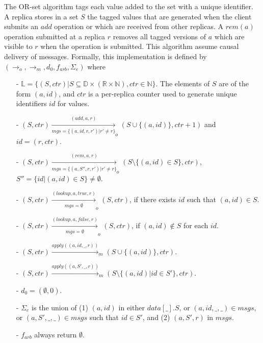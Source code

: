  The OR-set algorithm tags each value added to the set with a unique identifier. A replica stores in a set $S$ the tagged values that are generated when the client submits an $add$ operation or which are received from other replicas. A $\mathit{rem}(a)$ operation submitted at a replica $r$ removes all tagged versions of $a$ which are visible to $r$ when the operation is submitted. This algorithm assume causal delivery of messages. Formally, this implementation is defined by $(\rightarrow_o,\rightarrow_m,d_0,f_{\mathit{arb}}, \Sigma_e)$ where


\begin{itemize}
\setlength{\itemsep}{0.5pt}
\item[-] $\mathbb{L} = \{ (S,\mathit{ctr}) \vert S \subseteq \mathbb{D} \times (\mathbb{R} \times \mathbb{N}), \mathit{ctr} \in \mathbb{N} \}$. The elements of $S$ are of the form $(a,\mathit{id})$, and $\mathit{ctr}$ is a per-replica counter used to generate unique identifiers $\mathit{id}$ for values.

\item[-] $(S,\mathit{ctr}) \xrightarrow[\mathit{mgs} = \{ (a,\mathit{id},r,r') \vert r' \neq r \}]{(\mathit{add},a,r)}_o (S \cup \{ (a,\mathit{id}) \}, \mathit{ctr}+1)$ and $\mathit{id} = (r,\mathit{ctr})$.

\item[-] $(S,\mathit{ctr}) \xrightarrow[\mathit{mgs} = \{ (a,S'',r,r') \vert r' \neq r \} ]{(\mathit{rem},a,r)}_o (S \setminus \{ (a,\mathit{id}) \in S \}, \mathit{ctr})$, $S'' = \{ \mathit{id} \vert (a,\mathit{id}) \in S \} \neq \emptyset$.

\item[-] $(S,\mathit{ctr}) \xrightarrow[\mathit{mgs} = \emptyset]{(\mathit{lookup},a,\mathit{true},r)}_o (S, \mathit{ctr})$, if there exists $\mathit{id}$ such that $(a,\mathit{id}) \in S$.

\item[-] $(S,\mathit{ctr}) \xrightarrow[\mathit{mgs} = \emptyset]{(\mathit{lookup},a,\mathit{false},r)}_o (S, \mathit{ctr})$, if $(a,\mathit{id}) \notin S$ for each $\mathit{id}$.

\item[-] $(S,\mathit{ctr}) \xrightarrow{\mathit{apply}((a,\mathit{id},\_,r))}_m (S \cup \{ (a,\mathit{id}) \}, \mathit{ctr})$.

\item[-] $(S,\mathit{ctr}) \xrightarrow{\mathit{apply}((a,S',\_,r))}_m (S \setminus \{ (a,\mathit{id}) \vert \mathit{id} \in S' \}, \mathit{ctr})$.

\item[-] $d_0 = (\emptyset,0)$.

\item[-] $\Sigma_e$ is the union of (1) $(a,\mathit{id})$ in either $\mathit{data}[\_].S$, or $(a,\mathit{id},\_,\_) \in \mathit{msgs}$, or $(a,S',\_,\_) \in \mathit{msgs}$ such that $\mathit{id} \in S'$, and (2) $(a,S',r)$ in $\mathit{msgs}$.

\item[-] $f_{\mathit{arb}}$ always return $\emptyset$.
\end{itemize}




